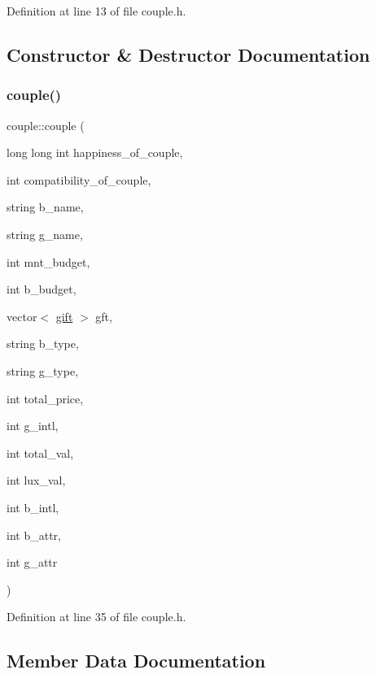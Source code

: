Definition at line 13 of file couple.\+h.



\subsection{Constructor \& Destructor Documentation}
\mbox{\label{classcouple_a44e38e9c0a12f8eaf33d538e736a0d65}} 
\subsubsection{\texorpdfstring{couple()}{couple()}}
{\footnotesize\ttfamily couple\+::couple (\begin{DoxyParamCaption}\item[{long long int}]{happiness\+\_\+of\+\_\+couple,  }\item[{int}]{compatibility\+\_\+of\+\_\+couple,  }\item[{string}]{b\+\_\+name,  }\item[{string}]{g\+\_\+name,  }\item[{int}]{mnt\+\_\+budget,  }\item[{int}]{b\+\_\+budget,  }\item[{vector$<$ \hyperlink{classgift}{gift} $>$}]{gft,  }\item[{string}]{b\+\_\+type,  }\item[{string}]{g\+\_\+type,  }\item[{int}]{total\+\_\+price,  }\item[{int}]{g\+\_\+intl,  }\item[{int}]{total\+\_\+val,  }\item[{int}]{lux\+\_\+val,  }\item[{int}]{b\+\_\+intl,  }\item[{int}]{b\+\_\+attr,  }\item[{int}]{g\+\_\+attr }\end{DoxyParamCaption})\hspace{0.3cm}{\ttfamily [inline]}}



Definition at line 35 of file couple.\+h.



\subsection{Member Data Documentation}
\mbox{\label{classcouple_a3d7d2ed58512c33ca7eacec507d958b1}} 
